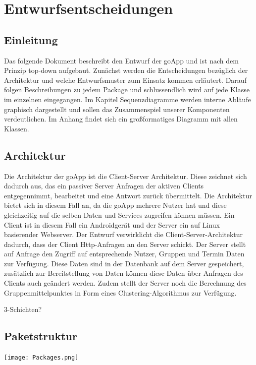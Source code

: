 

\section{Entwurfsentscheidungen}
	\subsection{Einleitung}
	Das folgende Dokument beschreibt den Entwurf der goApp und ist nach dem Prinzip top-down aufgebaut.
	Zunächst werden die Entscheidungen bezüglich der Architektur und welche Entwurfsmuster zum Einsatz kommen erläutert.
	Darauf folgen Beschreibungen zu jedem Package und schlussendlich wird auf jede Klasse im einzelnen eingegangen.
	Im Kapitel Sequenzdiagramme werden interne Abläufe graphisch dargestellt und sollen das Zusammenspiel unserer Komponenten verdeutlichen. 
	Im Anhang findet sich ein großformatiges Diagramm mit allen Klassen.
	\subsection{Architektur}
	Die Architektur der goApp ist die Client-Server Architektur. Diese zeichnet sich dadurch aus, das ein passiver Server Anfragen der aktiven Clients entgegennimmt, bearbeitet und eine Antwort zurück übermittelt. Die Architektur bietet sich in diesem Fall an, da die goApp mehrere Nutzer hat und diese gleichzeitig auf die selben Daten und Services zugreifen können müssen. 
	Ein Client ist in diesem Fall ein Androidgerät und der Server ein auf Linux basierender Webserver.
	Der Entwurf verwirklicht die Client-Server-Architektur dadurch, dass der Client Http-Anfragen an den Server schickt. Der Server stellt auf Anfrage den Zugriff auf entsprechende Nutzer, Gruppen und Termin Daten zur Verfügung. Diese Daten sind in der Datenbank auf dem Server gespeichert, zusätzlich zur Bereitstellung von Daten können diese Daten über Anfragen des Clients auch geändert werden. Zudem stellt der Server noch die Berechnung des Gruppenmittelpunktes in Form eines Clustering-Algorithmus zur Verfügung. 
	 
	3-Schichten?
	
	
	\subsection{Paketstruktur}
	 \texttt{[image: Packages.png]}

